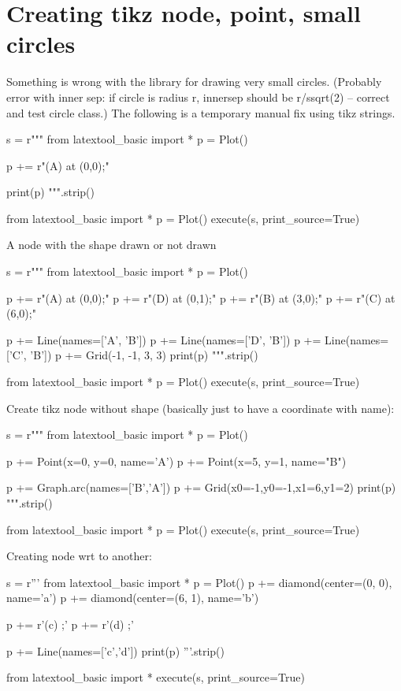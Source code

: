 \section{Creating tikz node, point, small circles}


Something is wrong with the library for drawing very small circles.
(Probably error with inner sep: if circle is radius r, innersep should be
r/ssqrt(2) -- correct and test circle class.)
The following is a temporary manual fix using tikz strings.
\begin{python}
s = r"""
from latextool_basic import *
p = Plot()

p += r"\node[draw,shape=circle,minimum size=0.1cm,fill=blue,inner sep=0](A) at (0,0){};"

print(p)
""".strip()

from latextool_basic import *
p = Plot()
execute(s, print_source=True)
\end{python}




\newpage
A node with the shape drawn or not drawn
\begin{python}
s = r"""
from latextool_basic import *
p = Plot()

p += r"\node[draw,shape=circle,minimum size=1cm,inner sep=0](A) at (0,0){};"
p += r"\node[draw,shape=circle,minimum size=1cm,inner sep=0](D) at (0,1){};"
p += r"\node[draw=none,shape=circle,minimum size=1cm,inner sep=0](B) at (3,0){};"
p += r"\node[draw,shape=circle,minimum size=1cm,inner sep=0](C) at (6,0){};"

p += Line(names=['A', 'B'])
p += Line(names=['D', 'B'])
p += Line(names=['C', 'B'])
p += Grid(-1, -1, 3, 3)
print(p)
""".strip()

from latextool_basic import *
p = Plot()
execute(s, print_source=True)
\end{python}




\newpage
Create tikz node without shape (basically just to have a coordinate with name):
\begin{python}
s = r"""
from latextool_basic import *
p = Plot()

p += Point(x=0, y=0, name='A')
p += Point(x=5, y=1, name="B")

p += Graph.arc(names=['B','A'])
p += Grid(x0=-1,y0=-1,x1=6,y1=2)
print(p)
""".strip()

from latextool_basic import *
p = Plot()
execute(s, print_source=True)
\end{python}




\newpage
Creating node wrt to another:
\begin{python}
s = r'''
from latextool_basic import *
p = Plot()
p += diamond(center=(0, 0), name='a')
p += diamond(center=(6, 1), name='b')

p += r'\node[right=0.0cm of a, inner sep=0.0cm, outer sep=0.0cm] (c) {};'
p += r'\node[below left=0.0cm of b, inner sep=0.0cm, outer sep=0.0cm] (d) {};'

p += Line(names=['c','d'])
print(p)
'''.strip()

from latextool_basic import *
execute(s, print_source=True)
\end{python}
